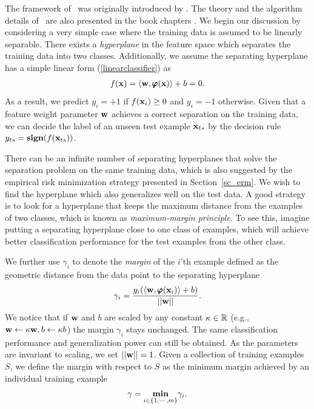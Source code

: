 {The framework of \svm\ was originally introduced by \citet{Cortes95support}.
The theory and the algorithm details of \svm\ are also presented in the book chapters \citep{Scholkopf02learning,Taylor04kernel,Bishop07}.
We begin our discussion by considering a very simple case where the training data is assumed to be linearly separable.
There exists a \textit{hyperplane} in the feature space which separates the training data into two classes.
Additionally, we assume the {separating hyperplane} has a simple linear form (\ref{linearclassifier}) as
\begin{align*}
	f(\mathbf {x})=\langle \mathbf {w}, \pmb \varphi(\mathbf {x}) \rangle + b = 0.
\end{align*}
As a result, we predict $y_i=+1$ if $f(\mathbf {x}_i)\ge0$ and $y_i=-1$ otherwise.
Given that a feature weight parameter $\mathbf {w}$ achieves a correct separation on the training data, we can decide the label of an unseen test example $\mathbf {x}_{ts}$ by the decision rule $y_{ts}=\textbf{sign}(f(\mathbf {x}_{ts}))$.

There can be an infinite number of separating hyperplanes that solve the separation problem on the same training data, which is also suggested by the empirical risk minimization strategy presented in Section~\ref{sc_erm}. 
We wish to find the hyperplane which also generalizes well on the test data.
A good strategy is to look for a hyperplane that keeps the maximum distance from the examples of two classes, which is known as \textit{maximum-margin principle}.
To see this, imagine putting a separating hyperplane close to one class of examples, which will achieve better classification performance for the test examples from the other class.

We further use $\gamma_i$ to denote the \textit{margin} of the $i$'th example defined as the geometric distance from the data point to the separating hyperplane
\begin{align*}
	\gamma_i = \frac{y_i(\langle \mathbf {w}, \pmb \varphi(\mathbf {x}_i) \rangle+b)}{\left|\left| \mathbf {w} \right|\right|}.
\end{align*}
We notice that if $\mathbf {w}$ and $b$ are scaled by any constant $\kappa\in\mathbb{R}$ (e.g., $\mathbf {w}\leftarrow\kappa\mathbf {w}, b\leftarrow\kappa b$) the margin $\gamma_i$ stays unchanged. 
The same classification performance and generalization power can still be obtained.
As the parameters are invariant to scaling, we set $\left|\left| \mathbf {w} \right|\right|=1$.
Given a collection of training examples $S$, we define the margin with respect to $S$ as the minimum margin achieved by an individual training example
\begin{align*}
	\gamma = \underset{i\in\{1,\cdots,m\}}{\textbf{min}}\gamma_i.
\end{align*}

}
